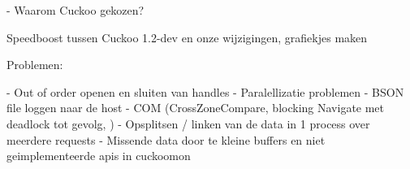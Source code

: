 
- Waarom Cuckoo gekozen?

Speedboost tussen Cuckoo 1.2-dev en onze wijzigingen, grafiekjes maken

Problemen:

- Out of order openen en sluiten van handles 
- Paralellizatie problemen
- BSON file loggen naar de host
- COM (CrossZoneCompare, blocking Navigate met deadlock tot gevolg, )
- Opsplitsen / linken van de data in 1 process over meerdere requests
- Missende data door te kleine buffers en niet geimplementeerde apis in cuckoomon